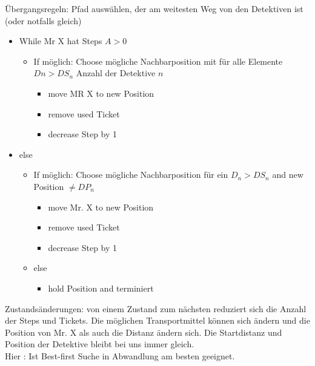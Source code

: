 \documentclass[12pt, paper=a4]{article}
\begin{document}
Übergangsregeln: Pfad auswählen, der am weitesten Weg von den
Detektiven ist (oder notfalls gleich)

\begin{itemize}
\item While Mr X hat Steps $A>0$
    \begin{itemize}
    \item If möglich: Choose mögliche Nachbarposition mit für alle Elemente $Dn> DS_n$ Anzahl der Detektive $n$
        \begin{itemize}
        \item move MR X to new Position
        \item remove used Ticket
        \item decrease Step by 1
        \end{itemize}
    \end{itemize}
\item else
    \begin{itemize}
    \item If möglich: Choose mögliche Nachbarposition für ein $D_n > DS_n$ and new Position $\neq DP_n$
        \begin{itemize}
        \item move Mr. X to new Position
        \item remove used Ticket
        \item decrease Step by 1
        \end{itemize}
    \item else
        \begin{itemize}
        \item hold Position and terminiert
        \end{itemize}
    \end{itemize}
\end{itemize}

Zustandsänderungen: von einem Zustand zum nächsten reduziert sich
die Anzahl der Steps und Tickets. Die möglichen Transportmittel
können sich ändern und die Position von Mr. X als auch die Distanz
ändern sich. Die Startdistanz und Position der Detektive bleibt bei uns
immer gleich.\\
Hier : Ist Best-first Suche in Abwandlung am besten geeignet.\\
\end{document}
